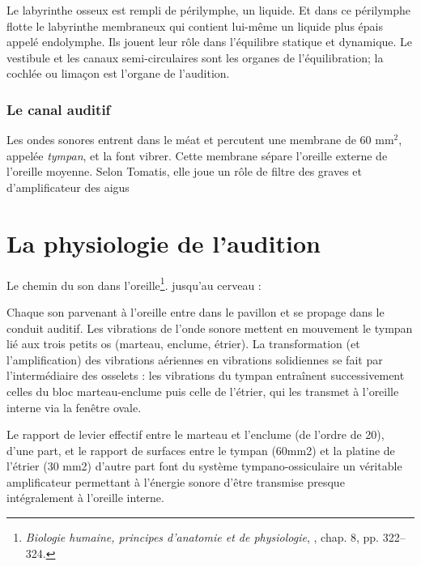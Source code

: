 Le labyrinthe
osseux est rempli de périlymphe, un liquide. Et dans ce périlymphe
flotte le labyrinthe membraneux qui contient lui-même un liquide
plus épais appelé endolymphe. Ils jouent leur rôle dans l'équilibre
statique et dynamique. Le vestibule et les canaux semi-circulaires
sont les organes de l'équilibration; la cochlée ou
limaçon est l'organe de l'audition. 

\subsubsection{Le canal auditif}

Les ondes sonores entrent dans le méat et percutent
une membrane de 60 mm$^2$, appelée \emph{tympan}, et la font vibrer. Cette membrane
sépare l'oreille externe de l'oreille moyenne. Selon Tomatis, elle
joue un rôle de filtre des graves et d'amplificateur des aigus




\section{La physiologie de l'audition}

Le chemin du son dans l'oreille\footnote{\textsl{Biologie humaine, principes d'anatomie et de physiologie}, \cite{marieb:biologie}, chap. 8, pp. 322--324.}. jusqu'au cerveau : 

Chaque son parvenant à l'oreille entre dans le pavillon et se propage
dans le conduit auditif. Les vibrations de l'onde sonore mettent en
mouvement le tympan lié aux trois petits os (marteau, enclume, étrier).
La transformation (et l\textquoteright amplification) des vibrations
aériennes en vibrations solidiennes se fait par l\textquoteright intermédiaire
des osselets : les vibrations du tympan entraînent successivement
celles du bloc marteau-enclume puis celle de l\textquoteright étrier,
qui les transmet à l\textquoteright oreille interne via la fenêtre
ovale.

Le rapport de levier effectif entre le marteau et l\textquoteright enclume
(de l\textquoteright ordre de 20), d\textquoteright une part, et le
rapport de surfaces entre le tympan (60mm2) et la platine de l\textquoteright étrier
(30 mm2) d\textquoteright autre part font du système tympano-ossiculaire
un véritable amplificateur permettant à l\textquoteright énergie sonore
d\textquoteright être transmise presque intégralement à l\textquoteright oreille
interne.


